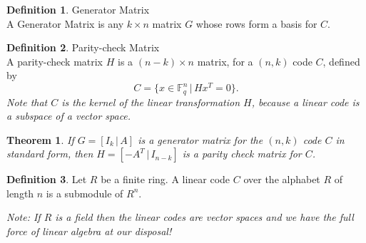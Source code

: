 \documentclass{article}
\newcommand{\F}{\mathbb{F}}
\newtheorem{theorem}{Theorem}
\theoremstyle{definition}
\newtheorem{definition}{Definition}
\begin{document}
\begin{definition}{Generator Matrix}\\
  A Generator Matrix is any $k\times n$ matrix $G$ whose rows form a basis for $C$.
\end{definition}

\begin{definition}{Parity-check Matrix}\\
  A parity-check matrix $H$ is a $(n-k)\times n$ matrix, for a $(n,k)$ code $C$, defined by \[C = \Big\{x\in\F^n_q \,|\, Hx^T = 0\Big\}.\] \textit{Note that $C$ is the kernel of the linear transformation $H$, because a linear code is a subspace of a vector space.}
\end{definition}

\begin{theorem}
  If $G = [I_k \,|\, A]$ is a generator matrix for the $(n,k)$ code $C$ in standard form, then $H = [-A^T \,|\, I_{n-k}]$ is a parity check matrix for $C$.
\end{theorem}

\begin{definition}
  Let $R$ be a finite ring. A linear code $C$ over the alphabet $R$ of length $n$ is a submodule of $R^n$.
\end{definition}
\textit{Note: If $R$ is a field then the linear codes are vector spaces and we have the full force of linear algebra at our disposal!}
\end{document}
